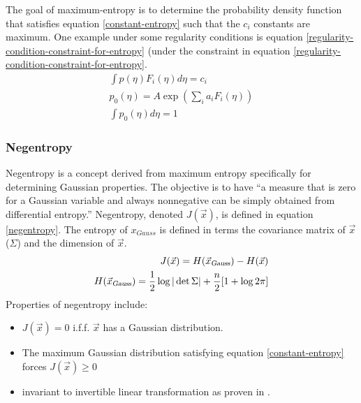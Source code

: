 \documentclass[12pt ]{article}
\begin{document}
The goal of maximum-entropy is to determine the probability density function that satisfies equation \ref{constant-entropy} such that the $c_i$ constants are maximum.  One example under some regularity conditions is equation \ref{regularity-condition-constraint-for-entropy} (under the constraint in equation \ref{regularity-condition-constraint-for-entropy}.
\begin{eqnarray}
\int p(\eta) F_i (\eta) d\eta =  c_i \label{constant-entropy} \\
p_0( \eta) = A \exp (\sum_i a_i F_i (\eta)) \label{regularity-condition-constraint-for-entropy} \\
\int p_0 (\eta) d \eta = 1 \label{system-regularity-condition-constraint-for-entropy} 
\end{eqnarray}


\subsubsection{Negentropy}\label{maximizing-via-negentropy}
Negentropy is a concept derived from maximum entropy specifically for determining Gaussian properties.  The objective is to have ``a measure that is zero for a Gaussian variable and always nonnegative can be simply obtained from differential entropy.''  Negentropy, denoted $J(\vec{x})$, is defined in equation \ref{negentropy}.  The entropy of $x_{Gauss}$ is defined in terms the covariance matrix of $\vec{x}$ ($\Sigma$) and the dimension of $\vec{x}$.
\begin{eqnarray}
J(\vec{x}) = H(\vec{x}_{\textsl{Gauss}}) - H(\vec{x}) \label{negentropyGauss}\\
H(\vec{x}_{\textsl{Gauss}}) = \frac{1}{2}\log |\det \Sigma | + \frac{n}{2}[1 + \log {2\pi}] \label{normalEntropy}
\end{eqnarray}
Properties of negentropy include:
\begin{itemize}
	\item $J(\vec{x}) = 0$ i.f.f. $\vec{x}$ has a Gaussian distribution.
	\item The maximum Gaussian distribution satisfying equation \ref{constant-entropy} forces $J(\vec{x}) \ge 0$
	\item invariant to invertible linear transformation as proven in \cite[113]{appo-ica-book}.
\end{itemize}
\end{document}
